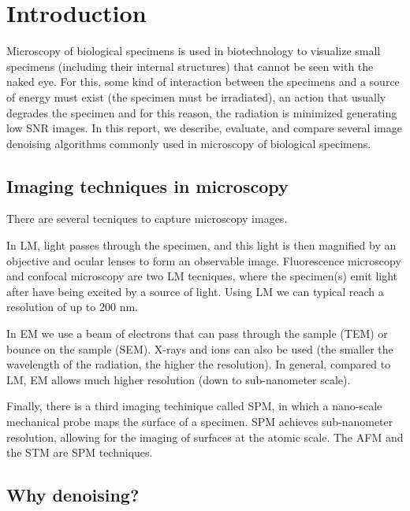 \chapter{Introduction}

Microscopy of biological specimens is used in biotechnology to
visualize small specimens (including their internal structures) that
cannot be seen with the naked eye. For this, some kind of interaction
between the specimens and a source of energy must exist (the specimen
must be irradiated), an action that usually degrades the specimen and
for this reason, the radiation is minimized generating low SNR
images. In this report, we describe, evaluate, and compare several
image denoising algorithms commonly used in microscopy of biological
specimens.

\section{Imaging techniques in microscopy}

There are several tecniques to capture microscopy images.

In \gls{LM}, light passes through the specimen, and this light is then
magnified by an objective and ocular lenses to form an observable
image. Fluorescence microscopy and confocal microscopy are two
\gls{LM} tecniques, where the specimen(s) emit light after have being
excited by a source of light. Using \gls{LM} we can typical reach a
resolution of up to 200 nm.

In \gls{EM} we use a beam of electrons that can pass through the
sample (\gls{TEM}) or bounce on the sample (\gls{SEM}). X-rays and
ions can also be used (the smaller the wavelength of the radiation,
the higher the resolution). In general, compared to \gls{LM}, \gls{EM}
allows much higher resolution (down to sub-nanometer scale).

Finally, there is a third imaging techinique called \gls{SPM}, in
which a nano-scale mechanical probe maps the surface of a
specimen. \gls{SPM} achieves sub-nanometer resolution, allowing for
the imaging of surfaces at the atomic scale. The \gls{AFM} and the
\gls{STM} are \gls{SPM} techniques.


\section{Why denoising?}
\label{sec:why_denoising}


